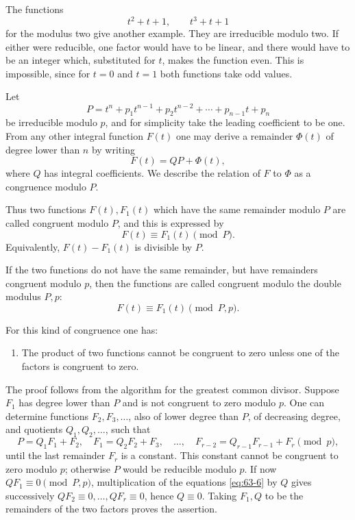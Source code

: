 \documentclass[11pt]{article}
\begin{document}
The functions
\[
 t^2+t+1,
 \qquad t^3+t+1
\]
for the modulus two give another example.  They are irreducible modulo two.  If either were reducible, one factor would have to be linear, and there would have to be an integer which, substituted for \(t\), makes the function even.  This is impossible, since for \(t=0\) and \(t=1\) both functions take odd values.

Let
\begin{equation}\label{eq:63-3}
 P=t^n+p_1t^{n-1}+p_2t^{n-2}+\cdots+p_{n-1}t+p_n
\end{equation}
be irreducible modulo \(p\), and for simplicity take the leading coefficient to be one.  From any other integral function \(F(t)\) one may derive a remainder \(\Phi(t)\) of degree lower than \(n\) by writing
\begin{equation}\label{eq:63-4}
 F(t)=QP+\Phi(t),
\end{equation}
where \(Q\) has integral coefficients.  We describe the relation of \(F\) to \(\Phi\) as a congruence modulo \(P\).

Thus two functions \(F(t),F_1(t)\) which have the same remainder modulo \(P\) are called congruent modulo \(P\), and this is expressed by
\[
 F(t)\equiv F_1(t)\pmod P.
\]
Equivalently, \(F(t)-F_1(t)\) is divisible by \(P\).

If the two functions do not have the same remainder, but have remainders congruent modulo \(p\), then the functions are called congruent modulo the double modulus \(P,p\):
\begin{equation}\label{eq:63-5}
 F(t)\equiv F_1(t)\pmod{P,p}.
\end{equation}

For this kind of congruence one has:

\begin{enumerate}[label=\arabic*.]
\item The product of two functions cannot be congruent to zero unless one of the factors is congruent to zero.
\end{enumerate}
The proof follows from the algorithm for the greatest common divisor.  Suppose \(F_1\) has degree lower than \(P\) and is not congruent to zero modulo \(p\).  One can determine functions \(F_2,F_3,\ldots\), also of lower degree than \(P\), of decreasing degree, and quotients \(Q_1,Q_2,\ldots\), such that
\begin{equation}\label{eq:63-6}
 P=Q_1F_1+F_2,
 \quad F_1=Q_2F_2+F_3,
 \quad\ldots,
 \quad F_{r-2}=Q_{r-1}F_{r-1}+F_r
 \pmod p,
\end{equation}
until the last remainder \(F_r\) is a constant.  This constant cannot be congruent to zero modulo \(p\); otherwise \(P\) would be reducible modulo \(p\).  If now \(QF_1\equiv0\pmod{P,p}\), multiplication of the equations \eqref{eq:63-6} by \(Q\) gives successively \(QF_2\equiv0,\ldots,QF_r\equiv0\), hence \(Q\equiv0\).  Taking \(F_1,Q\) to be the remainders of the two factors proves the assertion.
\end{document}
